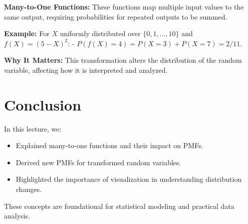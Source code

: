 \documentclass{article}
\begin{document}
\textbf{Many-to-One Functions:}
These functions map multiple input values to the same output, requiring probabilities for repeated outputs to be summed.

\textbf{Example:}
For $X$ uniformly distributed over $\{0, 1, \dots, 10\}$ and $f(X) = (5 - X)^2$:
- $P(f(X) = 4) = P(X = 3) + P(X = 7) = 2/11$.

\textbf{Why It Matters:}
This transformation alters the distribution of the random variable, affecting how it is interpreted and analyzed.

\section*{Conclusion}

In this lecture, we:
\begin{itemize}
  \item Explained many-to-one functions and their impact on PMFs.
  \item Derived new PMFs for transformed random variables.
  \item Highlighted the importance of visualization in understanding distribution changes.
\end{itemize}

These concepts are foundational for statistical modeling and practical data analysis.
\end{document}
